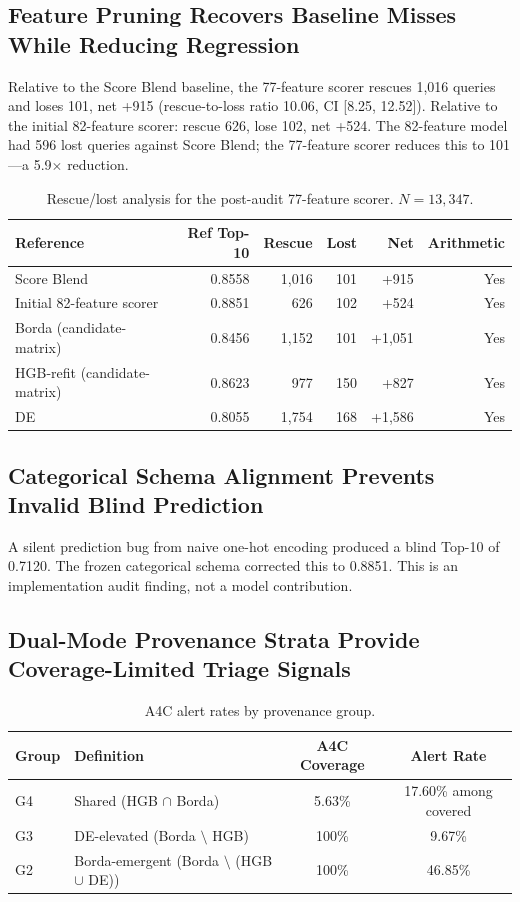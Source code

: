 \documentclass[12pt,letterpaper]{article}
\begin{document}
\subsection{Feature Pruning Recovers Baseline Misses While Reducing Regression}

Relative to the Score Blend baseline, the 77-feature scorer rescues 1,016 queries and loses 101, net +915 (rescue-to-loss ratio 10.06, CI [8.25, 12.52]). Relative to the initial 82-feature scorer: rescue 626, lose 102, net +524. The 82-feature model had 596 lost queries against Score Blend; the 77-feature scorer reduces this to 101---a 5.9$\times$ reduction.

\begin{table}[ht]
\centering
\caption{Rescue/lost analysis for the post-audit 77-feature scorer. $N = 13{,}347$.}
\label{tab:3}
\begin{tabular}{lrrrrr}
\toprule
Reference & Ref Top-10 & Rescue & Lost & Net & Arithmetic \\
\midrule
Score Blend & 0.8558 & 1,016 & 101 & +915 & Yes \\
Initial 82-feature scorer & 0.8851 & 626 & 102 & +524 & Yes \\
Borda (candidate-matrix) & 0.8456 & 1,152 & 101 & +1,051 & Yes \\
HGB-refit (candidate-matrix) & 0.8623 & 977 & 150 & +827 & Yes \\
DE & 0.8055 & 1,754 & 168 & +1,586 & Yes \\
\bottomrule
\end{tabular}
\end{table}

\subsection{Categorical Schema Alignment Prevents Invalid Blind Prediction}

A silent prediction bug from naive one-hot encoding produced a blind Top-10 of 0.7120. The frozen categorical schema corrected this to 0.8851. This is an implementation audit finding, not a model contribution.

\subsection{Dual-Mode Provenance Strata Provide Coverage-Limited Triage Signals}

\begin{table}[ht]
\centering
\caption{A4C alert rates by provenance group.}
\label{tab:4}
\begin{tabular}{llcc}
\toprule
Group & Definition & A4C Coverage & Alert Rate \\
\midrule
G4 & Shared (HGB $\cap$ Borda) & 5.63\% & 17.60\% among covered \\
G3 & DE-elevated (Borda $\setminus$ HGB) & 100\% & 9.67\% \\
G2 & Borda-emergent (Borda $\setminus$ (HGB $\cup$ DE)) & 100\% & 46.85\% \\
\bottomrule
\end{tabular}
\end{table}
\end{document}
